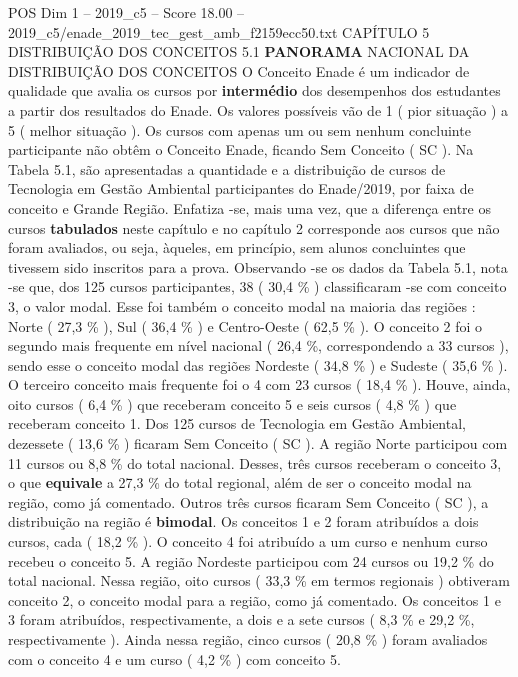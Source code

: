 \begin{textsample}{POS Dim 1 – 2019\_c5 – Score 18.00 – 2019\_c5/enade\_2019\_tec\_gest\_amb\_f2159ecc50.txt}  \label{ex:f1_pos_046}
CAPÍTULO 5 DISTRIBUIÇÃO DOS CONCEITOS 5.1 \textbf{PANORAMA} NACIONAL DA DISTRIBUIÇÃO DOS CONCEITOS O Conceito Enade é um indicador de qualidade que avalia os cursos por \textbf{intermédio} dos desempenhos dos estudantes a partir dos resultados do Enade.
Os valores possíveis vão de 1 ( pior situação ) a 5 ( melhor situação ).
Os cursos com apenas um ou sem nenhum concluinte participante não obtêm o Conceito Enade, ficando Sem Conceito ( SC ).
Na Tabela 5.1, são apresentadas a quantidade e a distribuição de cursos de Tecnologia em Gestão Ambiental participantes do Enade/2019, por faixa de conceito e Grande Região.
Enfatiza -se, mais uma vez, que a diferença entre os cursos \textbf{tabulados} neste capítulo e no capítulo 2 corresponde aos cursos que não foram avaliados, ou seja, àqueles, em princípio, sem alunos concluintes que tivessem sido inscritos para a prova.
Observando -se os dados da Tabela 5.1, nota -se que, dos 125 cursos participantes, 38 ( 30,4 \% ) classificaram -se com conceito 3, o valor modal.
Esse foi também o conceito modal na maioria das regiões : Norte ( 27,3 \% ), Sul ( 36,4 \% ) e Centro-Oeste ( 62,5 \% ).
O conceito 2 foi o segundo mais frequente em nível nacional ( 26,4 \%, correspondendo a 33 cursos ), sendo esse o conceito modal das regiões Nordeste ( 34,8 \% ) e Sudeste ( 35,6 \% ).
O terceiro conceito mais frequente foi o 4 com 23 cursos ( 18,4 \% ).
Houve, ainda, oito cursos ( 6,4 \% ) que receberam conceito 5 e seis cursos ( 4,8 \% ) que receberam conceito 1.
Dos 125 cursos de Tecnologia em Gestão Ambiental, dezessete ( 13,6 \% ) ficaram Sem Conceito ( SC ).
A região Norte participou com 11 cursos ou 8,8 \% do total nacional.
Desses, três cursos receberam o conceito 3, o que \textbf{equivale} a 27,3 \% do total regional, além de ser o conceito modal na região, como já comentado.
Outros três cursos ficaram Sem Conceito ( SC ), a distribuição na região é \textbf{bimodal}.
Os conceitos 1 e 2 foram atribuídos a dois cursos, cada ( 18,2 \% ).
O conceito 4 foi atribuído a um curso e nenhum curso recebeu o conceito 5.
A região Nordeste participou com 24 cursos ou 19,2 \% do total nacional.
Nessa região, oito cursos ( 33,3 \% em termos regionais ) obtiveram conceito 2, o conceito modal para a região, como já comentado.
Os conceitos 1 e 3 foram atribuídos, respectivamente, a dois e a sete cursos ( 8,3 \% e 29,2 \%, respectivamente ).
Ainda nessa região, cinco cursos ( 20,8 \% ) foram avaliados com o conceito 4 e um curso ( 4,2 \% ) com conceito 5.

\end{textsample}
